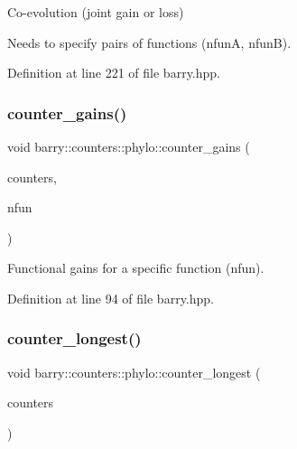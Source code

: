 Co-\/evolution (joint gain or loss) 

Needs to specify pairs of functions ({\ttfamily nfunA}, {\ttfamily nfunB}). 

Definition at line 221 of file barry.\+hpp.

\mbox{\label{namespacebarry_1_1counters_1_1phylo_a7f94d430b818b7bd9b2bcdc78ac2a29a}} 
\subsubsection{\texorpdfstring{counter\+\_\+gains()}{counter\_gains()}}
{\footnotesize\ttfamily void barry\+::counters\+::phylo\+::counter\+\_\+gains (\begin{DoxyParamCaption}\item[{\hyperlink{namespacebarry_1_1counters_1_1phylo_a2f117d1cd1dff67e1539cbc0aef5766a}{Phylo\+Counter\+Vector} $\ast$}]{counters,  }\item[{\hyperlink{namespacebarry_a11dfc53ddb4672278319aa04f1e09a6c}{uint}}]{nfun }\end{DoxyParamCaption})\hspace{0.3cm}{\ttfamily [inline]}}



Functional gains for a specific function ({\ttfamily nfun}). 



Definition at line 94 of file barry.\+hpp.

\mbox{\label{namespacebarry_1_1counters_1_1phylo_a0961e61bafbce356cb78de10b0aa9950}} 
\subsubsection{\texorpdfstring{counter\+\_\+longest()}{counter\_longest()}}
{\footnotesize\ttfamily void barry\+::counters\+::phylo\+::counter\+\_\+longest (\begin{DoxyParamCaption}\item[{\hyperlink{namespacebarry_1_1counters_1_1phylo_a2f117d1cd1dff67e1539cbc0aef5766a}{Phylo\+Counter\+Vector} $\ast$}]{counters }\end{DoxyParamCaption})\hspace{0.3cm}{\ttfamily [inline]}}



